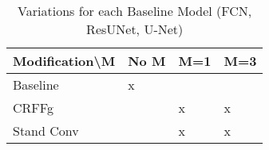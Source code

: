 \begin{table}[htbp]
\centering
\caption{Variations for each Baseline Model (FCN, ResUNet, U-Net)}
\begin{tabular}{|l|l|l|l|}
\hline
Modification\textbackslash M           & No M  & M=1 & M=3 \\ \hline
Baseline   & x &     &     \\ \hline
CRFFg      &   & x   & x   \\ \hline
Stand Conv &   & x   & x   \\ \hline
\end{tabular}
\end{table}